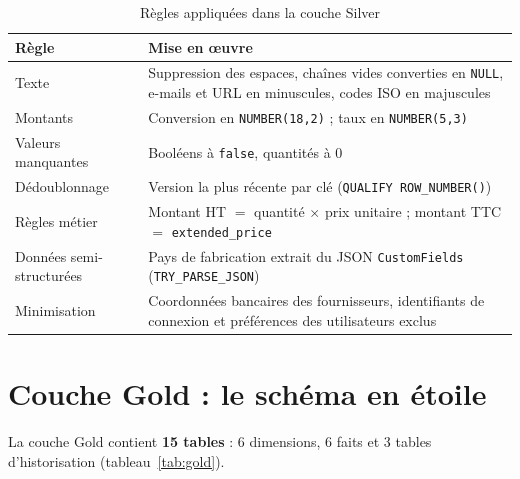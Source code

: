 \begin{table}[H]
\centering
\caption{Règles appliquées dans la couche Silver}
\label{tab:silver}
\begin{tabularx}{\linewidth}{@{}l X@{}}
\toprule
\textbf{Règle} & \textbf{Mise en œuvre} \\
\midrule
Texte & Suppression des espaces, chaînes vides converties en \texttt{NULL}, e-mails et URL en minuscules,
        codes ISO en majuscules \\
Montants & Conversion en \texttt{NUMBER(18,2)} ; taux en \texttt{NUMBER(5,3)} \\
Valeurs manquantes & Booléens à \texttt{false}, quantités à 0 \\
Dédoublonnage & Version la plus récente par clé (\texttt{QUALIFY ROW\_NUMBER()}) \\
Règles métier & Montant HT $=$ quantité $\times$ prix unitaire ; montant TTC $=$ \texttt{extended\_price} \\
Données semi-structurées & Pays de fabrication extrait du JSON \texttt{CustomFields} (\texttt{TRY\_PARSE\_JSON}) \\
Minimisation & Coordonnées bancaires des fournisseurs, identifiants de connexion et préférences des
               utilisateurs exclus \\
\bottomrule
\end{tabularx}
\end{table}

\section{Couche Gold : le schéma en étoile}

La couche Gold contient \textbf{15 tables} : 6 dimensions, 6 faits et 3 tables d'historisation
(tableau~\ref{tab:gold}).

